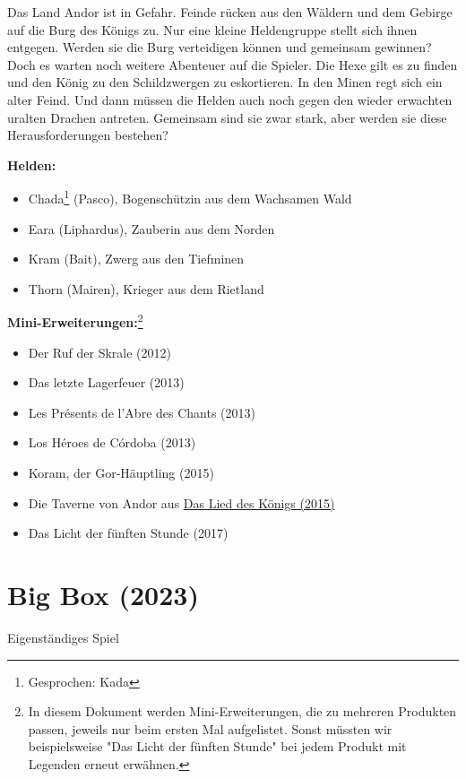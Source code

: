 \documentclass[10pt, a4paper, oneside]{book}
\newcommand{\fillbreak}{\vspace*{\fill}\columnbreak}
\newcommand{\produkt}[1]{%
    \section{#1}%
    \label{Produkt: #1}%
}
\newcommand{\refprodukt}[1]{\hyperref[Produkt: #1]{#1}}
\begin{document}
\begin{multicols}{2}
Das Land Andor ist in Gefahr. Feinde rücken aus den Wäldern und dem Gebirge auf die Burg des Königs zu. Nur eine kleine Heldengruppe stellt sich ihnen entgegen. Werden sie die Burg verteidigen können und gemeinsam gewinnen? Doch es warten noch weitere Abenteuer auf die Spieler. Die Hexe gilt es zu finden und den König zu den Schildzwergen zu eskortieren.
In den Minen regt sich ein alter Feind. Und dann müssen die Helden auch noch gegen den wieder erwachten uralten Drachen antreten. Gemeinsam sind sie zwar stark, aber werden sie diese Herausforderungen bestehen?\bigskip

\textbf{Helden:}

\begin{itemize}[topsep=0pt,itemsep=-1ex,partopsep=1ex,parsep=1ex]
    \item Chada\footnote{Gesprochen: Kada} (Pasco), Bogenschützin aus dem Wachsamen Wald
    \item Eara (Liphardus), Zauberin aus dem Norden
    \item Kram (Bait), Zwerg aus den Tiefminen
    \item Thorn (Mairen), Krieger aus dem Rietland
\end{itemize}

\textbf{Mini-Erweiterungen:}\footnote{In diesem Dokument werden Mini-Erweiterungen, die zu mehreren Produkten passen, jeweils nur beim ersten Mal aufgelistet. Sonst müssten wir beispielsweise "Das Licht der fünften Stunde" bei jedem Produkt mit Legenden erneut erwähnen.}

\begin{itemize}[topsep=0pt,itemsep=-1ex,partopsep=1ex,parsep=1ex]
    \item Der Ruf der Skrale (2012)
    \item Das letzte Lagerfeuer (2013)
    \item Les Présents de l'Abre des Chants (2013)
    \item Los Héroes de Córdoba (2013)
    \item Koram, der Gor-Häuptling (2015)
    \item Die Taverne von Andor aus \refprodukt{Das Lied des Königs (2015)}
    \item Das Licht der fünften Stunde (2017)
\end{itemize}




\fillbreak
\produkt{Big Box (2023)}



\begin{center}
    Eigenständiges Spiel
\end{center}


\end{multicols}
\end{document}
